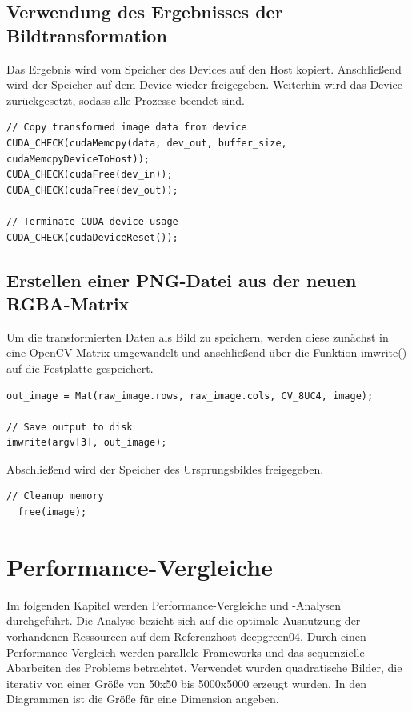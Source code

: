 \documentclass{llncs}
\begin{document}
%
\subsection{Verwendung des Ergebnisses der Bildtransformation}
%
Das Ergebnis wird vom Speicher des Devices auf den Host kopiert. Anschließend wird der Speicher auf dem Device wieder freigegeben. Weiterhin wird das Device zurückgesetzt, sodass alle Prozesse beendet sind.\\
\newpage
\begin{lstlisting}
// Copy transformed image data from device
CUDA_CHECK(cudaMemcpy(data, dev_out, buffer_size, cudaMemcpyDeviceToHost));
CUDA_CHECK(cudaFree(dev_in));
CUDA_CHECK(cudaFree(dev_out));

// Terminate CUDA device usage
CUDA_CHECK(cudaDeviceReset());
\end{lstlisting}

%
\subsection{Erstellen einer PNG-Datei aus der neuen RGBA-Matrix}
%
Um die transformierten Daten als Bild zu speichern, werden diese zunächst in eine OpenCV-Matrix umgewandelt und anschließend über die Funktion imwrite() auf die Festplatte gespeichert.

\begin{lstlisting}
out_image = Mat(raw_image.rows, raw_image.cols, CV_8UC4, image);

// Save output to disk
imwrite(argv[3], out_image);
\end{lstlisting}

Abschließend wird der Speicher des Ursprungsbildes freigegeben.

\begin{lstlisting}
// Cleanup memory
  free(image);
\end{lstlisting}


%
\section{Performance-Vergleiche}
%

Im folgenden Kapitel werden Performance-Vergleiche und -Analysen durchgeführt. Die Analyse bezieht sich auf die optimale Ausnutzung der vorhandenen Ressourcen auf dem Referenzhost deepgreen04. Durch einen Performance-Vergleich werden parallele Frameworks und das sequenzielle Abarbeiten des Problems betrachtet.  Verwendet wurden quadratische Bilder, die iterativ von einer Größe von 50x50 bis 5000x5000 erzeugt wurden. In den Diagrammen ist die Größe für eine Dimension angeben.
\end{document}
